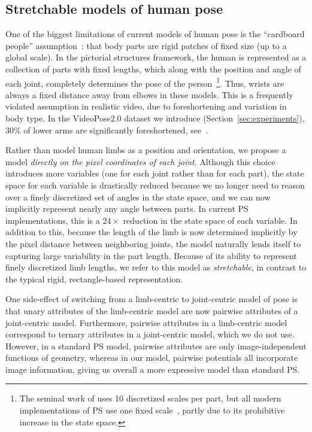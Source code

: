 \subsection{Stretchable models of human pose}  One of the biggest limitations 
of current models of human pose is the ``cardboard people'' 
assumption~\citep{cardboard}: that body parts are rigid patches of fixed size 
(up to a global scale).  In the pictorial structures framework, the human is 
represented as a collection of parts with fixed lengths, which along with the 
position and angle of each joint, completely determines the pose of the 
person~\footnote{The seminal work of \citet{felz05} uses 10 discretized scales 
per part, but all modern implementations of PS use one fixed 
scale~\citep{sapp2010cascades,ferrari08,andriluka09}, partly due to its 
prohibitive increase in the state space.}.  Thus, wrists are always a fixed 
distance away from elbows in these models. This is a frequently violated 
assumption in realistic video, due to foreshortening and variation in body 
type.  In the VideoPose2.0 dataset we  introduce 
(Section~\ref{sec:experiments}), 30\% of lower arms are significantly 
foreshortened, see~.

 Rather than model human limbs as a position 
and orientation, we propose a model {\em directly on the pixel coordinates of 
each joint}.  Although this choice introduces more variables 
(one for each joint rather than for each part), the state space for each 
variable is drastically reduced because we no longer need to reason over a 
finely discretized set of angles in the state space, and we can now implicitly 
represent nearly any angle between parts.  In current PS implementations, this is a 
$24\times$ reduction in the state space of each variable.  In addition to 
this, because the length of the limb is now determined implicitly by the pixel 
distance between neighboring joints, the model naturally lends itself to 
capturing large variability in the part length.  Because of its ability to 
represent finely discretized limb lengths, we refer to this model as
{\em stretchable}, in contrast to the typical rigid, rectangle-based 
representation.

One side-effect of switching from a limb-centric to joint-centric model of 
pose is that unary attributes of the limb-centric model are now pairwise 
attributes of a joint-centric model.  Furthermore, pairwise attributes in a 
limb-centric model correspond to ternary attributes in a joint-centric model, 
which we do not use.  However, in a standard PS model, pairwise attributes are 
only image-independent functions of geometry, whereas in our model, pairwise 
potentials all incorporate image information, giving us overall a more 
expressive model than standard PS. 



